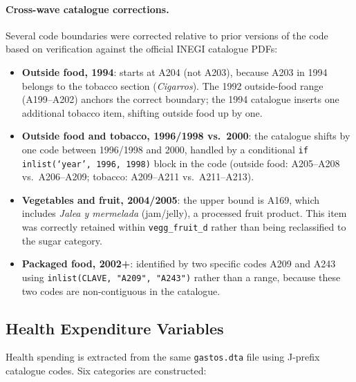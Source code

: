 \paragraph{Cross-wave catalogue corrections.}
Several code boundaries were corrected relative to prior versions of the code
based on verification against the official INEGI catalogue PDFs:

\begin{itemize}
  \item \textbf{Outside food, 1994}: starts at A204 (not A203), because A203
    in 1994 belongs to the tobacco section (\textit{Cigarros}). The 1992
    outside-food range (A199--A202) anchors the correct boundary; the 1994
    catalogue inserts one additional tobacco item, shifting outside food up by
    one.
  \item \textbf{Outside food and tobacco, 1996/1998 vs.\ 2000}: the catalogue
    shifts by one code between 1996/1998 and 2000, handled by a conditional
    \texttt{if inlist(`year', 1996, 1998)} block in the code (outside food:
    A205--A208 vs.\ A206--A209; tobacco: A209--A211 vs.\ A211--A213).
  \item \textbf{Vegetables and fruit, 2004/2005}: the upper bound is A169,
    which includes \textit{Jalea y mermelada} (jam/jelly), a processed fruit
    product. This item was correctly retained within \texttt{vegg\_fruit\_d}
    rather than being reclassified to the sugar category.
  \item \textbf{Packaged food, 2002+}: identified by two specific codes A209
    and A243 using \texttt{inlist(CLAVE, "A209", "A243")} rather than a range,
    because these two codes are non-contiguous in the catalogue.
\end{itemize}

\subsection{Health Expenditure Variables}
\label{app:enigh_health}

Health spending is extracted from the same \texttt{gastos.dta} file using
J-prefix catalogue codes. Six categories are constructed:

